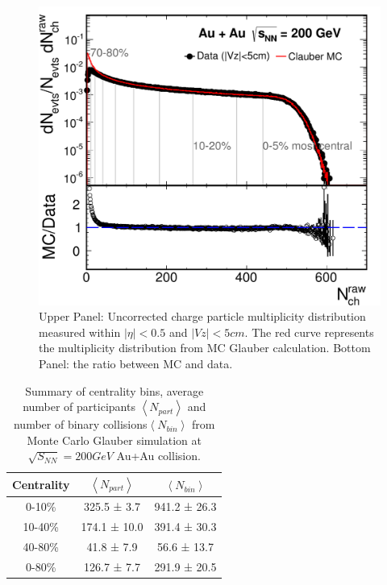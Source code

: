 \begin{figure}
\begin{centering}
\includegraphics[scale=0.7]{fig/3.Analysis/Additional/dataset/paper_RefMult}
\par\end{centering}

\protect\caption{Upper Panel: Uncorrected charge particle multiplicity distribution
measured within $|\eta|<0.5$ and $|Vz|<5cm$. The red curve represents
the multiplicity distribution from MC Glauber calculation. Bottom
Panel: the ratio between MC and data.}


\label{fig:refmult}
\end{figure}


\begin{table}
\begin{centering}
\begin{tabular}{c|c|c}
\hline 
Centrality & $\left\langle N_{part}\right\rangle $ & $\left\langle N_{bin}\right\rangle $\tabularnewline
\hline 
\hline 
0-10\% & 325.5 ± 3.7 & 941.2 ± 26.3\tabularnewline
\hline 
10-40\% & 174.1 ± 10.0 & 391.4 ± 30.3\tabularnewline
\hline 
40-80\% & 41.8 ± 7.9 & 56.6 ± 13.7\tabularnewline
\hline 
\hline 
0-80\% & 126.7 ± 7.7 & 291.9 ± 20.5\tabularnewline
\hline 
\end{tabular}
\par\end{centering}

\protect\caption{Summary of centrality bins, average number of participants $\left\langle N_{part}\right\rangle $
and number of binary collisions$\left\langle N_{bin}\right\rangle $
from Monte Carlo Glauber simulation at $\sqrt{S_{NN}}=200GeV$ Au+Au
collision. }


\label{table:Npart Nbin Cen}
\end{table}



